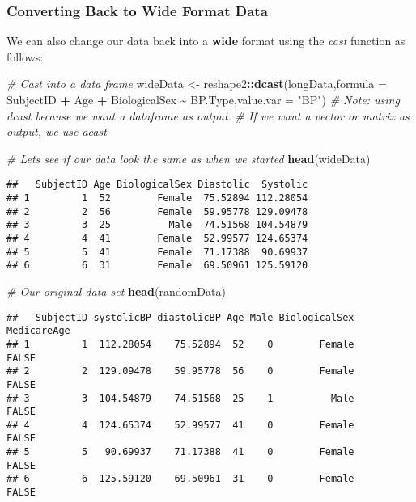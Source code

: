 \documentclass[
]{article}
\newenvironment{Shaded}{\begin{snugshade}}{\end{snugshade}}
\newcommand{\AttributeTok}[1]{\textcolor[rgb]{0.13,0.29,0.53}{#1}}
\newcommand{\CommentTok}[1]{\textcolor[rgb]{0.56,0.35,0.01}{\textit{#1}}}
\newcommand{\FunctionTok}[1]{\textcolor[rgb]{0.13,0.29,0.53}{\textbf{#1}}}
\newcommand{\NormalTok}[1]{#1}
\newcommand{\OtherTok}[1]{\textcolor[rgb]{0.56,0.35,0.01}{#1}}
\newcommand{\SpecialCharTok}[1]{\textcolor[rgb]{0.81,0.36,0.00}{\textbf{#1}}}
\newcommand{\StringTok}[1]{\textcolor[rgb]{0.31,0.60,0.02}{#1}}
\begin{document}
\subsubsection{Converting Back to Wide Format
Data}\label{converting-back-to-wide-format-data}

We can also change our data back into a \textbf{wide} format using the
\emph{cast} function as follows:

\begin{Shaded}
\begin{Highlighting}[]
\CommentTok{\# Cast into a data frame}
\NormalTok{wideData }\OtherTok{\textless{}{-}}\NormalTok{ reshape2}\SpecialCharTok{::}\FunctionTok{dcast}\NormalTok{(longData,}\AttributeTok{formula =}\NormalTok{  SubjectID }\SpecialCharTok{+}\NormalTok{ Age }\SpecialCharTok{+}\NormalTok{ BiologicalSex }\SpecialCharTok{\textasciitilde{}}\NormalTok{ BP.Type,}\AttributeTok{value.var =} \StringTok{"BP"}\NormalTok{)}
\CommentTok{\# Note: using dcast because we want a dataframe as output. }
\CommentTok{\# If we want a vector or matrix as output, we use acast}

\CommentTok{\# Lets see if our data look the same as when we started}
\FunctionTok{head}\NormalTok{(wideData)}
\end{Highlighting}
\end{Shaded}

\begin{verbatim}
##   SubjectID Age BiologicalSex Diastolic  Systolic
## 1         1  52        Female  75.52894 112.28054
## 2         2  56        Female  59.95778 129.09478
## 3         3  25          Male  74.51568 104.54879
## 4         4  41        Female  52.99577 124.65374
## 5         5  41        Female  71.17388  90.69937
## 6         6  31        Female  69.50961 125.59120
\end{verbatim}

\begin{Shaded}
\begin{Highlighting}[]
\CommentTok{\# Our original data set}
\FunctionTok{head}\NormalTok{(randomData)}
\end{Highlighting}
\end{Shaded}

\begin{verbatim}
##   SubjectID systolicBP diastolicBP Age Male BiologicalSex MedicareAge
## 1         1  112.28054    75.52894  52    0        Female       FALSE
## 2         2  129.09478    59.95778  56    0        Female       FALSE
## 3         3  104.54879    74.51568  25    1          Male       FALSE
## 4         4  124.65374    52.99577  41    0        Female       FALSE
## 5         5   90.69937    71.17388  41    0        Female       FALSE
## 6         6  125.59120    69.50961  31    0        Female       FALSE
\end{verbatim}
\end{document}
